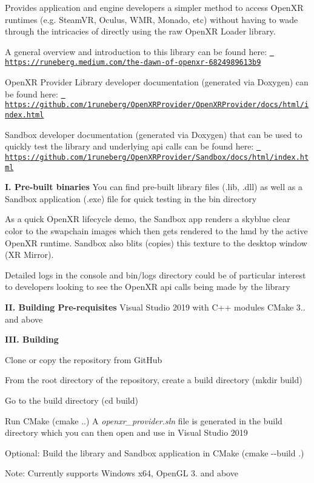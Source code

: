 Provides application and engine developers a simpler method to access Open\+XR runtimes (e.\+g. Steam\+VR, Oculus, W\+MR, Monado, etc) without having to wade through the intricacies of directly using the raw Open\+XR Loader library.

A general overview and introduction to this library can be found here\+: \href{https://runeberg.medium.com/the-dawn-of-openxr-6824989613b9}{\texttt{ https\+://runeberg.\+medium.\+com/the-\/dawn-\/of-\/openxr-\/6824989613b9}}

Open\+XR Provider Library developer documentation (generated via Doxygen) can be found here\+: \href{https://github.com/1runeberg/OpenXRProvider/OpenXRProvider/docs/html/index.html}{\texttt{ https\+://github.\+com/1runeberg/\+Open\+X\+R\+Provider/\+Open\+X\+R\+Provider/docs/html/index.\+html}}

Sandbox developer documentation (generated via Doxygen) that can be used to quickly test the library and underlying api calls can be found here\+: \href{https://github.com/1runeberg/OpenXRProvider/Sandbox/docs/html/index.html}{\texttt{ https\+://github.\+com/1runeberg/\+Open\+X\+R\+Provider/\+Sandbox/docs/html/index.\+html}}

{\bfseries{I. Pre-\/built binaries}} You can find pre-\/built library files (.lib, .dll) as well as a Sandbox application (.exe) file for quick testing in the {\ttfamily bin} directory

As a quick Open\+XR lifecycle demo, the Sandbox app renders a skyblue clear color to the swapchain images which then gets rendered to the hmd by the active Open\+XR runtime. Sandbox also blits (copies) this texture to the desktop window (XR Mirror).

Detailed logs in the console and {\ttfamily bin/logs} directory could be of particular interest to developers looking to see the Open\+XR api calls being made by the library

{\bfseries{II. Building Pre-\/requisites}} Visual Studio 2019 with C++ modules C\+Make 3.. and above

{\bfseries{I\+II. Building}}
\begin{DoxyEnumerate}
\item Clone or copy the repository from Git\+Hub
\item From the root directory of the repository, create a build directory ({\ttfamily mkdir build})
\item Go to the build directory ({\ttfamily cd build})
\item Run C\+Make ({\ttfamily cmake ..}) A {\itshape openxr\+\_\+provider.\+sln} file is generated in the build directory which you can then open and use in Visual Studio 2019
\item Optional\+: Build the library and Sandbox application in C\+Make ({\ttfamily cmake -\/-\/build .})
\end{DoxyEnumerate}

Note\+: Currently supports Windows x64, Open\+GL 3. and above 